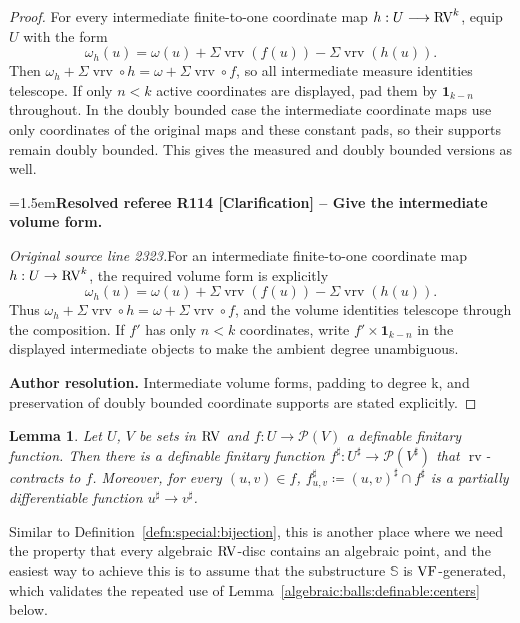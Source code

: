 \documentclass[12pt]{amsart}
\newcommand{\ResolvedRefereeRemark}[5]{%
  \par\medskip\begingroup\normalfont\small\color{gray}%
  \emergencystretch=1.5em\noindent\textbf{Resolved referee R#1 [#2] -- #3.}\par\nobreak\noindent #4\par
  \medskip\color{ResolutionGreen}\noindent\textbf{Author resolution.} #5\par
  \endgroup\medskip
}
\theoremstyle{plain}
\newtheorem{lem}[thm]{Lemma}
\theoremstyle{definition}
\theoremstyle{remark}
\numberwithin{equation}{section}
\theoremstyle{plain}
\newcommand{\VF}{\textup{VF}}
\newcommand{\RV}{\textup{RV}}
\newcommand{\0}{\emptyset}
\newcommand{\mdl}[1]{\mathcal{#1}}  %
\newcommand{\bb}[1]{\mathbb{#1}}
\newcommand{\fun}{\longrightarrow}
\DeclareMathOperator{\rv}{rv}
\DeclareMathOperator{\vrv}{vrv}
\begin{document}
\begin{proof}
For every intermediate finite-to-one coordinate map $h:U\fun\RV^k$, equip $U$ with the form
\[
\omega_h(u)=\omega(u)+\Sigma\vrv(f(u))-\Sigma\vrv(h(u)).
\]
Then $\omega_h+\Sigma\vrv\circ h=\omega+\Sigma\vrv\circ f$, so all intermediate measure identities telescope. If only $n<k$ active coordinates are displayed, pad them by $\mathbf1_{k-n}$ throughout. In the doubly bounded case the intermediate coordinate maps use only coordinates of the original maps and these constant pads, so their supports remain doubly bounded. This gives the measured and doubly bounded versions as well.

\ResolvedRefereeRemark{114}{Clarification}{Give the intermediate volume form}{%
\textit{Original source line 2323.}\quad For an intermediate finite-to-one coordinate map $h:U\to\RV^k$, the required volume form is explicitly
\[
\omega_h(u)=\omega(u)+\Sigma\vrv(f(u))-\Sigma\vrv(h(u)).
\]
Thus $\omega_h+\Sigma\vrv\circ h=\omega+\Sigma\vrv\circ f$, and the volume identities telescope through the composition. If $f'$ has only $n<k$ coordinates, write $f'\times\mathbf1_{k-n}$ in the displayed intermediate objects to make the ambient degree unambiguous.
}{Intermediate volume forms, padding to degree k, and preservation of doubly bounded coordinate supports are stated explicitly.}
\end{proof}


\begin{lem}\label{RVlift}
Let $U$, $V$ be sets in $\RV$ and $f : U \fun \mdl P(V)$ a definable finitary function. Then there is a definable finitary function $f^\sharp : U^\sharp \fun \mdl P(V^\sharp)$ that $\rv$-contracts to $f$. Moreover, for every $(u, v) \in f$, $f^\sharp_{u, v} \coloneqq (u, v)^\sharp \cap f^\sharp$ is a partially differentiable function $u^\sharp \fun v^\sharp$.
\end{lem}

Similar to Definition~\ref{defn:special:bijection}, this is another place where we need the property that every algebraic $\RV$-disc contains an algebraic point, and the easiest way to achieve
this is to assume that the substructure $\bb S$ is $\VF$-generated, which validates the repeated use of Lemma~\ref{algebraic:balls:definable:centers} below.
\end{document}
